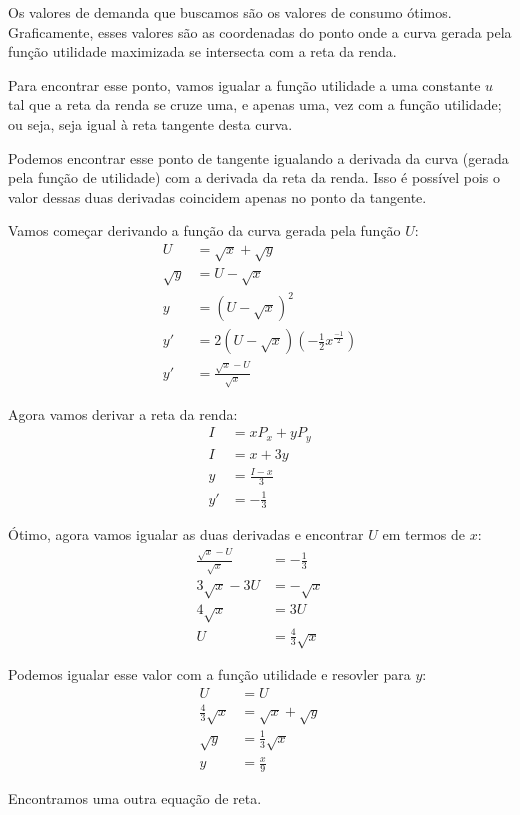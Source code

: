 \documentclass{article}
\begin{document}
Os valores de demanda que buscamos são os valores de consumo ótimos.
Graficamente, esses valores são as coordenadas do ponto onde a curva gerada
pela função utilidade maximizada se intersecta com a reta da renda.

Para encontrar esse ponto, vamos igualar a função utilidade a uma constante
\(u\) tal que a reta da renda se cruze uma, e apenas uma, vez com a função
utilidade; ou seja, seja igual à reta tangente desta curva.

Podemos encontrar esse ponto de tangente igualando a derivada da curva (gerada
pela função de utilidade) com a derivada da reta da renda. Isso é possível
pois o valor dessas duas derivadas coincidem apenas no ponto da tangente.

Vamos começar derivando a função da curva gerada pela função \(U\):
\[
	\begin{aligned}
		U        & = \sqrt{x} + \sqrt{y}                                        \\
		\sqrt{y} & = U - \sqrt{x}                                               \\
		y        & = {(U - \sqrt{x})}^2                                         \\
		y'       & = 2(U - \sqrt{x}) \left(-\frac{1}{2} x^{\frac{-1}{2}}\right) \\
		y'       & = \frac{\sqrt{x} - U}{\sqrt{x}}
	\end{aligned}
\]

Agora vamos derivar a reta da renda:
\[
	\begin{aligned}
		I  & = x P_x + y P_y   \\
		I  & = x + 3y          \\
		y  & = \frac{I - x}{3} \\
		y' & = -\frac{1}{3}
	\end{aligned}
\]

Ótimo, agora vamos igualar as duas derivadas e encontrar \(U\) em termos de
\(x\):
\[
	\begin{aligned}
		\frac{\sqrt{x} - U}{\sqrt{x}} & = -\frac{1}{3}        \\
		3\sqrt{x} - 3 U               & = - \sqrt{x}          \\
		4\sqrt{x}                     & = 3U                  \\
		U                             & = \frac{4}{3}\sqrt{x}
	\end{aligned}
\]

Podemos igualar esse valor com a função utilidade e resovler para \(y\):
\[
	\begin{aligned}
		U                   & = U                    \\
		\frac{4}{3}\sqrt{x} & = \sqrt{x} + \sqrt{y}  \\
		\sqrt{y}            & = \frac{1}{3} \sqrt{x} \\
		y                   & = \frac{x}{9}
	\end{aligned}
\]

Encontramos uma outra equação de reta.
\end{document}
